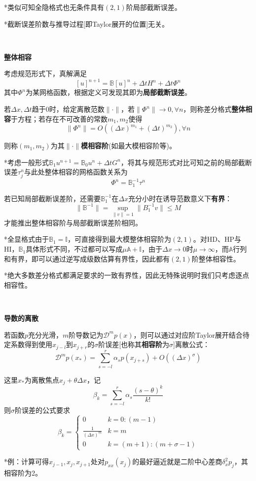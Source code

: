 \documentclass[a4paper,UTF8,fontset=windows]{ctexart}
\begin{document}
*类似可知全隐格式也无条件具有$(2,1)$阶局部截断误差。

*截断误差阶数与推导过程[即Taylor展开的位置]无关。

\

\textbf{整体相容}

考虑规范形式下，真解满足
$$[u]^{n+1}=\mathbb{B}[u]^n+\Delta tH^n+\Delta t\Phi^n$$
其中$\Phi^n$为某网格函数，根据定义可发现其即为\textbf{局部截断误差}。

若$\Delta x,\Delta t$趋于0时，给定离散范数$\|\cdot\|$，若$\|\Phi^n\|\to0,\forall n$，则称差分格式\textbf{整体相容}于方程；若存在不可改善的常数$m_1,m_2$使得
$$\|\Phi^n\|=O((\Delta x)^{m_1}+(\Delta t)^{m_2}),\forall n$$

则称$(m_1,m_2)$为其$\|\cdot\|$\textbf{模相容阶}(如最大模相容阶等)。

*考虑一般形式$\mathbb{B}_1u^{n+1}=\mathbb{B}_0u^n+\Delta tG^n$，将其与规范形式对比可知之前的局部截断误差$\tau_j^n$与此处整体相容的网格函数关系为
$$\Phi^n=\mathbb{B}_1^{-1}\tau^n$$

若已知局部截断误差阶，还需要$\mathbb{B}_1^{-1}$在$\Delta x$充分小时在诱导范数意义下\textbf{有界}：
$$\|\mathbb{B}^{-1}\|=\sup_{\|v\|=1}\|B_1^{-1}v\|\le M$$
才能推出整体相容阶与局部截断误差阶相同。

*全显格式由于$\mathbb{B}_1=\mathbb{I}$，可直接得到最大模整体相容阶为$(2,1)$。对HD、HP与HI，$\mathbb{B}_1$具体形式不同，不过都可以写成$\mu\mathbb{A}+\mathbb{I}$，由于$\Delta x\to0$时$\mu\to\infty$，而$\mathbb{A}$行列和有界，即可以通过逆写成级数估算有界性，因此都有$(2,1)$阶整体相容性。

*绝大多数差分格式都满足要求的一致有界性，因此无特殊说明时我们只考虑逐点相容性。

\

\textbf{导数的离散}

若函数$p$充分光滑，$m$阶导数记为$\mathcal{D}^mp(x)$，则可以通过对应阶Taylor展开结合待定系数得到使用$x_{j-l}$到$x_{j+r}$的$\sigma$阶误差[也称其\textbf{相容阶}为$\sigma$]离散公式：
$$\mathcal{D}^mp(x_*)=\sum_{s=-l}^r\alpha_sp(x_{j+s})+O((\Delta x)^\sigma)$$

这里$x_*$为离散焦点$x_j+\theta\Delta x$，记
$$\beta_k=\sum_{s=-l}^r\alpha_s\frac{(s-\theta)^k}{k!}$$
则$\sigma$阶误差的公式要求
$$\beta_k=\begin{cases}0&k=0:(m-1)\\\frac{1}{(\Delta x)^m}&k=m\\0&k=(m+1):(m+\sigma-1)\end{cases}$$

*例：计算可得$x_{j-1},x_j,x_{j+1}$处对$p_{xx}(x_j)$的最好逼近就是二阶中心差商$\delta_x^2p_j$，其相容阶为2。
\end{document}
